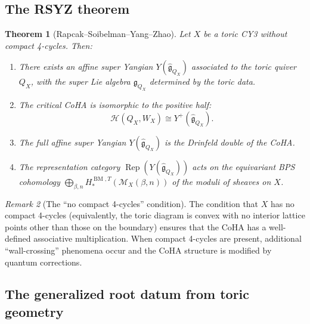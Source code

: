 \documentclass[11pt]{article}
\newtheorem{theorem}{Theorem}[section]
\theoremstyle{definition}
\theoremstyle{remark}
\newtheorem{remark}[theorem]{Remark}
\newcommand{\Rep}{\operatorname{Rep}}
\newcommand{\CoHA}{\mathcal{H}}
\newcommand{\cM}{\mathcal{M}}
\newcommand{\frakg}{\mathfrak{g}}
\newcommand{\BM}{\operatorname{BM}}
\begin{document}
\subsection{The RSYZ theorem}
\label{subsec:rsyz-thm}

\begin{theorem}[Rapcak--Soibelman--Yang--Zhao]
\label{thm:rsyz}
Let $X$ be a toric CY3 without compact 4-cycles. Then:
\begin{enumerate}[label=(\roman*)]
 \item There exists an affine super Yangian $Y(\widehat{\frakg}_{Q_X})$
 associated to the toric quiver $Q_X$, with the super Lie algebra
 $\frakg_{Q_X}$ determined by the toric data.
 \item The critical CoHA is isomorphic to the positive half:
 \[
 \CoHA(Q_X, W_X) \cong Y^+(\widehat{\frakg}_{Q_X}).
 \]
 \item The full affine super Yangian $Y(\widehat{\frakg}_{Q_X})$ is the
 Drinfeld double of the CoHA.
 \item The representation category $\Rep(Y(\widehat{\frakg}_{Q_X}))$
 acts on the equivariant BPS cohomology
 $\bigoplus_{\beta, n} H^{\BM,T}_*(\cM_X(\beta, n))$ of the moduli
 of sheaves on $X$.
\end{enumerate}
\end{theorem}

\begin{remark}[The ``no compact 4-cycles'' condition]
\label{rem:no-compact-4}
The condition that $X$ has no compact 4-cycles (equivalently, the toric
diagram is convex with no interior lattice points other than those on
the boundary) ensures that the CoHA has a well-defined associative
multiplication. When compact 4-cycles are present, additional
``wall-crossing'' phenomena occur and the CoHA structure is modified
by quantum corrections.
\end{remark}


\subsection{The generalized root datum from toric geometry}
\label{subsec:root-datum}
\end{document}
